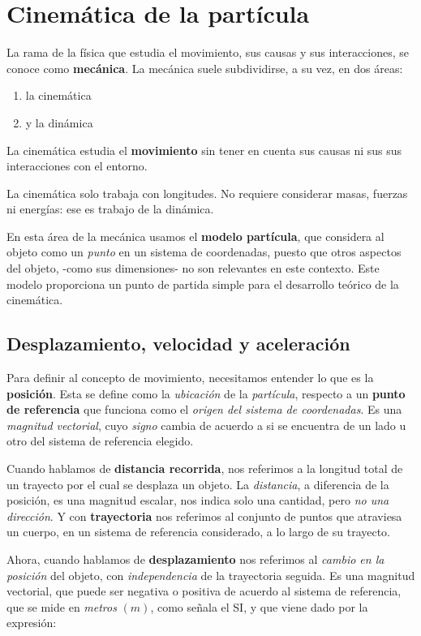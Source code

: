 \section{Cinemática de la partícula}

La rama de la física que estudia el movimiento,
sus causas y sus interacciones,
se conoce como \textbf{mecánica}.
La mecánica suele subdividirse,
a su vez,
en dos áreas:
\begin{enumerate}
    \item la cinemática 
    \item y la dinámica 
\end{enumerate}

La cinemática estudia el \textbf{movimiento} sin tener en cuenta sus causas ni sus
sus interacciones con el entorno.

La cinemática solo trabaja con longitudes.
No requiere considerar masas, fuerzas ni energías:
ese es trabajo de la dinámica.

En esta área de la mecánica usamos el \textbf{modelo partícula},
que considera al objeto como un \textit{punto} en un sistema de coordenadas,
puesto que otros aspectos del objeto,
-como sus dimensiones-
no son relevantes en este contexto.
Este modelo proporciona un punto de partida simple para el desarrollo teórico de 
la cinemática.

\subsection{Desplazamiento, velocidad y aceleración}

Para definir al concepto de movimiento,
necesitamos entender lo que es la \textbf{posición}.
Esta se define como la \textit{ubicación} de la \textit{partícula},
respecto a un \textbf{punto de referencia}
que funciona como el \textit{origen del sistema de coordenadas}.
Es una \textit{magnitud vectorial},
cuyo \textit{signo} cambia de acuerdo a si se encuentra de un lado u otro 
del sistema de referencia elegido.

Cuando hablamos de \textbf{distancia recorrida},
nos referimos a la longitud total de un trayecto por el cual se desplaza un 
objeto.
La \textit{distancia}, a diferencia de la posición, es una magnitud escalar,
nos indica solo una cantidad, pero \textit{no una dirección}.
Y con \textbf{trayectoria} nos referimos al conjunto de puntos que atraviesa 
un cuerpo, en un sistema de referencia considerado,
a lo largo de su trayecto.

Ahora,
cuando hablamos de \textbf{desplazamiento}
nos referimos al \textit{cambio en la posición} del objeto,
con \textit{independencia} de la trayectoria seguida.
Es una magnitud vectorial,
que puede ser negativa o positiva de acuerdo al sistema de referencia,
que se mide en \textit{metros} \((m)\),
como señala el SI,
y que viene dado por la expresión:

